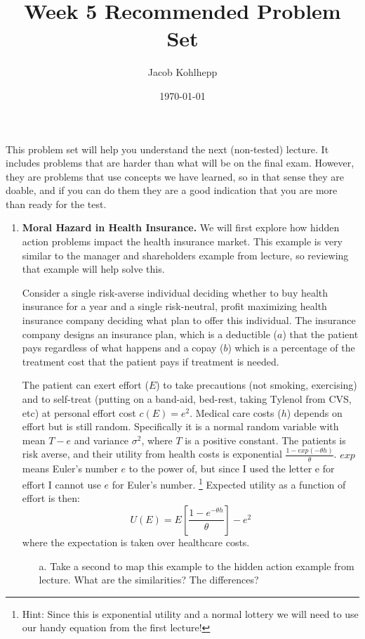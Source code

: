\documentclass{article}
\begin{document}
\title{Week 5 Recommended Problem Set}
\author{Jacob Kohlhepp}
\date{\today}

\maketitle

This problem set will help you understand the next (non-tested) lecture. It includes problems that are harder than what will be on the final exam. However, they are problems that use concepts we have learned, so in that sense they are doable, and if you can do them they are a good indication that you are more than ready for the test.
\begin{enumerate}
    \item \textbf{Moral Hazard in Health Insurance.} We will first explore how hidden action problems impact the health insurance market. This example is very similar to the manager and shareholders example from lecture, so reviewing that example will help solve this.
    
    Consider a single risk-averse individual deciding whether to buy health insurance for a year and a single risk-neutral, profit maximizing health insurance company deciding what plan to offer this individual. The insurance company designs an insurance plan, which is a deductible ($a$) that the patient pays regardless of what happens and a copay ($b$) which is a percentage of the treatment cost that the patient pays if treatment is needed. 
    
    The patient can exert effort ($E$) to take precautions (not smoking, exercising) and to self-treat (putting on a band-aid, bed-rest, taking Tylenol from CVS, etc) at personal effort cost $c(E)=e^2$. Medical care costs ($h$) depends on effort but is still random. Specifically it is a normal random variable with mean $T-e$ and variance $\sigma^2$, where $T$ is a positive constant. The patients is risk averse, and their utility from health costs is exponential $\frac{1-exp(-\theta h)}{\theta}$. $exp$ means Euler's number $e$ to the power of, but since I used the letter e for effort I cannot use $e$ for Euler's number. \footnote{Hint: Since this is exponential utility and a normal lottery we will need to use our handy equation from the first lecture!} Expected utility as a function of effort is then:
    \[U(E) = E[\frac{1-e^{-\theta h}}{\theta}] - e^2\]
    where the expectation is taken over healthcare costs.
    
    \begin{enumerate}
        \item[a.] Take a second to map this example to the hidden action example from lecture. What are the similarities? The differences?
        

\end{enumerate}
\end{enumerate}
\end{document}

